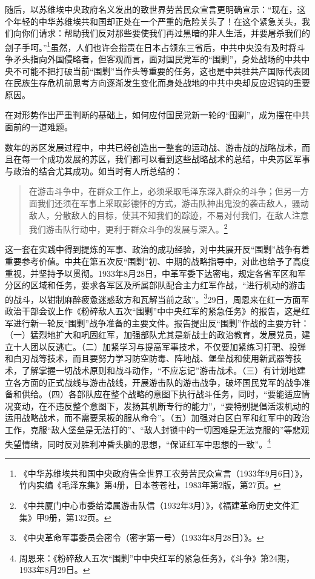 随后，以苏维埃中央政府名义发出的致世界劳苦民众宣言更明确宣示：“现在，这个年轻的中华苏维埃共和国却正处在一个严重的危险关头了！在这个紧急关头，我们向你们请求：帮助我们反对那些要使我们再过黑暗的非人生活，并要屠杀我们的刽子手呵。”\footnote{《中华苏维埃共和国中央政府告全世界工农劳苦民众宣言（1933年9月6日）》，竹内实编《毛泽东集》第4册，日本苍苍社，1983年第2版，第27页。}虽然，人们也许会指责在日本占领东三省后，中共中央没有及时将斗争矛头指向外国侵略者，但客观而言，面对国民党军的“围剿”，身处战场的中共中央不可能不把打破当前“围剿”当作头等重要的任务，这也是中共驻共产国际代表团在民族生存危机前思考方向逐渐发生变化而身处战地的中共中央却反应迟钝的重要原因。


在对形势作出严重判断的基础上，如何应付国民党新一轮的“围剿”，成为摆在中共面前的一道难题。


数年的苏区发展过程中，中共已经创造出一整套的运动战、游击战的战略战术，而且在每一个成功发展的苏区，我们都可以看到这些战略战术的总结，中央苏区军事与政治的结合尤其成功。如当时有人所总结的：

\begin{quote}

在游击斗争中，在群众工作上，必须采取毛泽东深入群众的斗争；但另一方面我们还须在军事上采取彭德怀的方式，游击队神出鬼没的袭击敌人，骚动敌人，分散敌人的目标，使其不知我们的踪迹，不易对付我们，在敌人注意我们游击队行动中，更利于群众斗争的发展与深入。\footnote{《中共厦门中心市委给漳属游击队信（1932年3月）》，《福建革命历史文件汇集》甲9册，第132页。}
\end{quote}


这一套在实践中得到提炼的军事、政治的成功经验，对中共展开反“围剿”战争有着重要参考价值。中共在第五次反“围剿”初、中期的战略指导中，对此也给予了高度重视，并坚持予以贯彻。1933年8月28日，中革军委下达密电，规定各省军区和军分区的区域和任务，要求各军区及所属部队配合主力红军作战，“进行机动的游击的战斗，以钳制麻醉疲惫迷惑敌方和瓦解当前之敌”。\footnote{《中央革命军事委员会密令（密字第一号）（1933年8月28日）》。}29日，周恩来在红一方面军政治干部会议上作《粉碎敌人五次“围剿”中中央红军的紧急任务》的报告，这是红军进行新一轮反“围剿”战争准备的主要文件。报告提出反“围剿”作战的主要方针：（一）猛烈地扩大和巩固红军，加强部队尤其是新战士的政治教育，发展党员，建立十人团以反逃亡。（二）加紧学习与提高军事技术，不仅要加紧练习打靶、投弹和白刃战等技术，而且要努力学习防空防毒、阵地战、堡垒战和使用新武器等技术，了解掌握一切战术原则和战斗动作，“不应忘记”游击战术。（三）有计划地建立各方面的正式战线与游击战线，开展游击队的游击战争，破坏国民党军的战争准备和供给。（四）各部队应在整个战略的意图下执行战斗任务，同时，“要能适应情况变动，在不违反整个意图下，发扬其机断专行的能力”，“要特别提倡活泼机动的运用战略战术，而不需要呆板的服从命令”。（五）加强对白区白军和红军中的政治工作，克服“敌人堡垒是无法打的”、“敌人封锁中的一切困难是无法克服的”等悲观失望情绪，同时反对胜利冲昏头脑的思想，“保证红军中思想的一致”。\footnote{周恩来：《粉碎敌人五次“围剿”中中央红军的紧急任务》，《斗争》第24期，1933年8月29日。}


